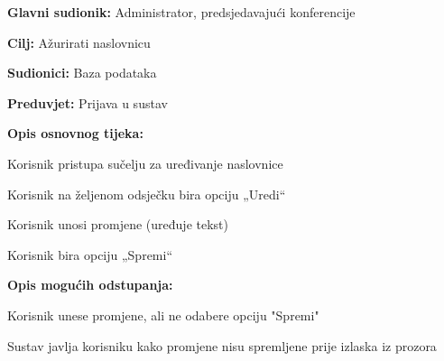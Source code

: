 					\noindent {}
					\begin{packed_item}
						\item \textbf{Glavni sudionik:} Administrator, predsjedavajući konferencije
						\item \textbf{Cilj:} Ažurirati naslovnicu
						\item \textbf{Sudionici:} Baza podataka
						\item \textbf{Preduvjet:} Prijava u sustav
						
						\item \textbf{Opis osnovnog tijeka:} 
						\item[] \begin{packed_enum}
							\item Korisnik pristupa sučelju za uređivanje naslovnice
							\item Korisnik na željenom odsječku bira opciju „Uredi“
							\item Korisnik unosi promjene (uređuje tekst)
							\item Korisnik bira opciju „Spremi“
						\end{packed_enum}
					
						\item \textbf{Opis mogućih odstupanja:}
						\item[] \begin{packed_enum}

							\item[2.a] Korisnik unese promjene, ali ne odabere opciju "Spremi"
							\item[] \begin{packed_enum}
								\item[1.] Sustav javlja korisniku kako promjene nisu spremljene prije izlaska iz prozora
							\end{packed_enum}
							
						\end{packed_enum}
					\end{packed_item}

